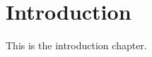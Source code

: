 \documentclass[../main.tex]{subfiles}
\begin{document}
\chapter{Introduction}

This is the introduction chapter.
\end{document}
